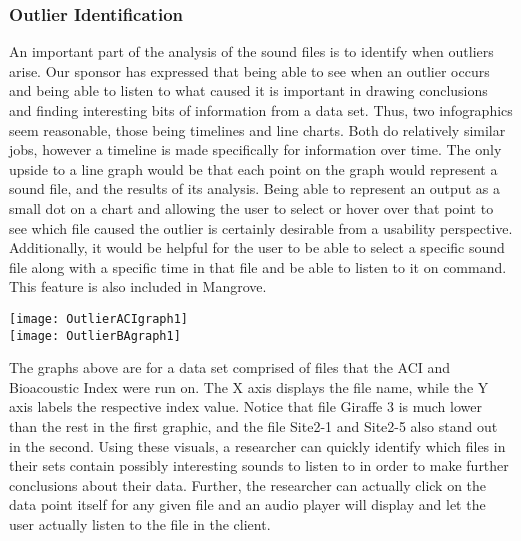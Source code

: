 \subsubsection{Outlier Identification}
An important part of the analysis of the sound files is to identify when outliers arise. Our sponsor has expressed that being able to see when an outlier occurs and being able to listen to what caused it is important in drawing conclusions and finding interesting bits of information from a data set. Thus, two infographics seem reasonable, those being timelines and line charts. Both do relatively similar jobs, however a timeline is made specifically for information over time. The only upside to a line graph would be that each point on the graph would represent a sound file, and the results of its analysis. Being able to represent an output as a small dot on a chart and allowing the user to select or hover over that point to see which file caused the outlier is certainly desirable from a usability perspective. Additionally, it would be helpful for the user to be able to select a specific sound file along with a specific time in that file and be able to listen to it on command. This feature is also included in Mangrove.\par
\begin{center}
  \texttt{[image: OutlierACIgraph1]} \\[12pt]
  \texttt{[image: OutlierBAgraph1]} \\[12pt]
\end{center}
The graphs above are for a data set comprised of files that the ACI and Bioacoustic Index were run on. The X axis displays the file name, while the Y axis labels the respective index value. Notice that file Giraffe 3 is much lower than the rest in the first graphic, and the file Site2-1 and Site2-5 also stand out in the second. Using these visuals, a researcher can quickly identify which files in their sets contain possibly interesting sounds to listen to in order to make further conclusions about their data. Further, the researcher can actually click on the data point itself for any given file and an audio player will display and let the user actually listen to the file in the client.
